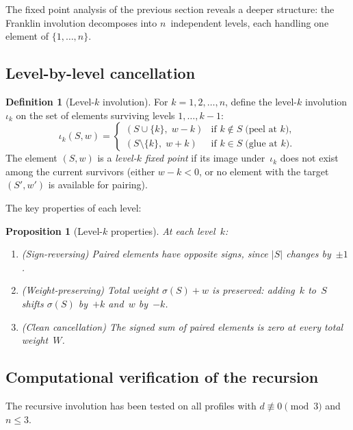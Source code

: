 \documentclass[11pt]{article}
\theoremstyle{plain}
\newtheorem{proposition}[theorem]{Proposition}
\theoremstyle{definition}
\newtheorem{definition}[theorem]{Definition}
\begin{document}
The fixed point analysis of the previous section reveals a
deeper structure: the Franklin involution decomposes into
$n$~independent levels, each handling one element of
$\{1, \ldots, n\}$.

\subsection{Level-by-level cancellation}

\begin{definition}[Level-$k$ involution]
\label{def:level-k}
For $k = 1, 2, \ldots, n$, define the level-$k$ involution
$\iota_k$ on the set of elements surviving levels
$1, \ldots, k-1$:
\[
  \iota_k(S, w) =
  \begin{cases}
    (S \cup \{k\},\; w - k) & \text{if } k \notin S
      \;\text{(peel at $k$)}, \\
    (S \setminus \{k\},\; w + k) & \text{if } k \in S
      \;\text{(glue at $k$)}.
  \end{cases}
\]
The element $(S, w)$ is a \emph{level-$k$ fixed point} if
its image under~$\iota_k$ does not exist among the current
survivors (either $w - k < 0$, or no element with the
target $(S', w')$ is available for pairing).
\end{definition}

The key properties of each level:

\begin{proposition}[Level-$k$ properties]
\label{prop:level-k}
At each level~$k$:
\begin{enumerate}
  \item \textup{(Sign-reversing)}\;
    Paired elements have opposite signs, since $|S|$
    changes by~$\pm 1$.
  \item \textup{(Weight-preserving)}\;
    Total weight $\sigma(S) + w$ is preserved: adding~$k$
    to~$S$ shifts $\sigma(S)$ by~$+k$ and~$w$ by~$-k$.
  \item \textup{(Clean cancellation)}\;
    The signed sum of paired elements is zero at every
    total weight~$W$.
\end{enumerate}
\end{proposition}


\subsection{Computational verification of the recursion}

The recursive involution has been tested on all profiles
with $d \not\equiv 0 \pmod{3}$ and $n \leq 3$.
\end{document}
